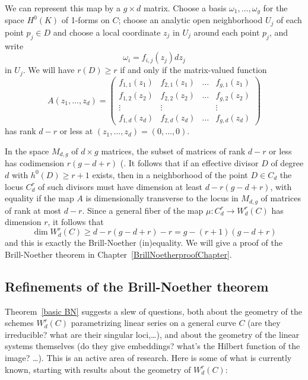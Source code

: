 We can represent this map by a $g \times d$ matrix. Choose a basis $\omega_1,\dots,\omega_g$ for the space $H^0(K)$ of 1-forms on $C$; choose an analytic open neighborhood $U_j$ of each point $p_j \in D$ and choose a local coordinate $z_j$ in $U_j$ around each point $p_j$, and write
$$
\omega_i = f_{i,j}(z_j)dz_j
$$
in $U_j$. We will have $r(D) \geq r$ if and only if the  matrix-valued function
$$
A(z_1,\dots,z_d) = 
\begin{pmatrix}
f_{1,1}(z_1) & f_{2,1}(z_1) & \dots & f_{g,1}(z_1) \\
f_{1,2}(z_2) & f_{2,2}(z_2) & \dots & f_{g,2}(z_2) \\
\vdots & \vdots &  & \vdots \\
f_{1,d}(z_d) & f_{2,d}(z_d) & \dots & f_{g,d} (z_d)
\end{pmatrix}
$$
has rank $d-r$ or less at $(z_1,\dots,z_d) = (0,\dots,0)$.


In the space $M_{d,g}$ of $d \times g$ matrices, the subset of matrices of rank $d-r$ or less has codimension $r(g-d+r)$ (\cite[Exercise 10.9]{Eisenbud1995}. 
It follows 
that if  an effective divisor $D$ of degree $d$ with $h^0(D) \geq r+1$ exists, then in a neighborhood of the point $D \in C_d$ the locus $C^r_d$ of such divisors must have dimension at least $d - r(g-d+r)$, with equality if the map $A$ is dimensionally transverse to the locus in $M_{d,g}$ of matrices of rank at most $d-r$. Since a general fiber of the map $\mu : C^r_d \to W^r_d(C)$ has dimension $r$, it follows that 
$$
\dim W^r_d(C) \geq d - r(g-d+r) - r = g - (r+1)(g-d+r)
$$
and this is exactly the  Brill-Noether (in)equality. We will give a proof of the Brill-Noether theorem in Chapter~\ref{BrillNoetherproofChapter}.


\subsection{Refinements of the Brill-Noether theorem}

Theorem~\ref{basic BN} suggests a slew of questions, both about the geometry of the schemes $W^r_d(C)$ parametrizing linear series on a general curve $C$ (are they irreducible? what are their singular loci,\dots), and about the geometry of the linear systems themselves (do they give embeddings? what's the Hilbert function of the image? \dots). This is an active area of research. Here is some of what is currently known, starting with results about the geometry of $W^r_d(C)$:

